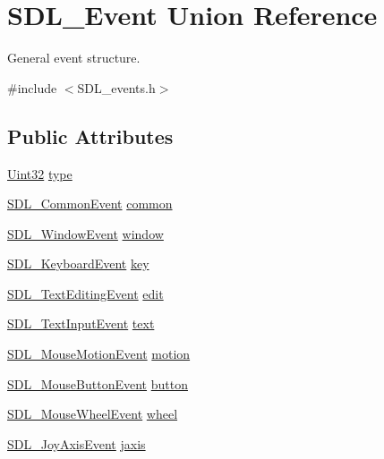 \hypertarget{unionSDL__Event}{}\section{S\+D\+L\+\_\+\+Event Union Reference}
\label{unionSDL__Event}


General event structure.  




{\ttfamily \#include $<$S\+D\+L\+\_\+events.\+h$>$}

\subsection*{Public Attributes}
\begin{DoxyCompactItemize}
\item 
\hyperlink{SDL__stdinc_8h_add440eff171ea5f55cb00c4a9ab8672d}{Uint32} \hyperlink{unionSDL__Event_a237648bec242d2d5835f1a4250ddfa46}{type}
\item 
\hyperlink{structSDL__CommonEvent}{S\+D\+L\+\_\+\+Common\+Event} \hyperlink{unionSDL__Event_abe5cb8767f93de55163c8ddd4562a7f2}{common}
\item 
\hyperlink{structSDL__WindowEvent}{S\+D\+L\+\_\+\+Window\+Event} \hyperlink{unionSDL__Event_a826936b3275406d857bc6654669fae71}{window}
\item 
\hyperlink{structSDL__KeyboardEvent}{S\+D\+L\+\_\+\+Keyboard\+Event} \hyperlink{unionSDL__Event_ab99927835cc77a9b6bb50b419b4a27df}{key}
\item 
\hyperlink{structSDL__TextEditingEvent}{S\+D\+L\+\_\+\+Text\+Editing\+Event} \hyperlink{unionSDL__Event_a9a7e3b67b2654d4c5fc509676c6a7183}{edit}
\item 
\hyperlink{structSDL__TextInputEvent}{S\+D\+L\+\_\+\+Text\+Input\+Event} \hyperlink{unionSDL__Event_aa4fc65c559d69f33c057c0c23d8414b8}{text}
\item 
\hyperlink{structSDL__MouseMotionEvent}{S\+D\+L\+\_\+\+Mouse\+Motion\+Event} \hyperlink{unionSDL__Event_ac3c89e190faacbe84280cd539453bab6}{motion}
\item 
\hyperlink{structSDL__MouseButtonEvent}{S\+D\+L\+\_\+\+Mouse\+Button\+Event} \hyperlink{unionSDL__Event_ab6da2fa2687e5f849f270adecc64785f}{button}
\item 
\hyperlink{structSDL__MouseWheelEvent}{S\+D\+L\+\_\+\+Mouse\+Wheel\+Event} \hyperlink{unionSDL__Event_a267d3f550715519ec90a81ccd0e6cbda}{wheel}
\item 
\hyperlink{structSDL__JoyAxisEvent}{S\+D\+L\+\_\+\+Joy\+Axis\+Event} \hyperlink{unionSDL__Event_ac4611acd0e9c675e67dc20919f0accb4}{jaxis}

\end{DoxyCompactItemize}

